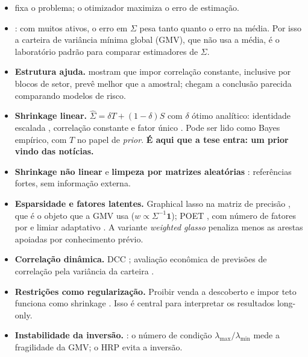 \documentclass[11pt,a4paper]{article}
\newcommand{\Sig}{\hat\Sigma}
\begin{document}
\begin{itemize}
  \item \citet{markowitz1952} fixa o problema; o otimizador maximiza o erro de estimação.
  \item \citet{kan2007}: com muitos ativos, o erro em $\Sigma$ pesa tanto quanto o erro na média.
        Por isso a carteira de variância mínima global (GMV), que não usa a média, é o laboratório
        padrão para comparar estimadores de $\Sigma$.
  \item \textbf{Estrutura ajuda.} \citet{elton1973} mostram que impor correlação constante, inclusive por
        blocos de setor, prevê melhor que a amostral; \citet{chan1999} chegam a conclusão parecida
        comparando modelos de risco.
  \item \textbf{Shrinkage linear.} $\Sig=\delta T+(1-\delta)S$ com $\delta$ ótimo analítico:
        identidade escalada \citep{ledoit2004jmva}, correlação constante \citep{ledoit2004honey} e
        fator único \citep{ledoit2003}. Pode ser lido como Bayes empírico, com $T$ no papel de
        \emph{prior}. \textbf{É aqui que a tese entra: um prior vindo das notícias.}
  \item \textbf{Shrinkage não linear} \citep{ledoit2017,ledoit2020} e \textbf{limpeza por matrizes
        aleatórias} \citep{laloux1999,bun2017}: referências fortes, sem informação externa.
  \item \textbf{Esparsidade e fatores latentes.} Graphical lasso na matriz de precisão
        \citep{friedman2008}, que é o objeto que a GMV usa ($w\propto\Sigma^{-1}\mathbf 1$); POET
        \citep{fan2013}, com número de fatores por \citet{bai2002} e limiar adaptativo
        \citep{cai2011}. A variante \emph{weighted glasso} penaliza menos as arestas apoiadas por
        conhecimento prévio.
  \item \textbf{Correlação dinâmica.} DCC \citep{engle2002}; avaliação econômica de previsões de
        correlação pela variância da carteira \citep{engle2006}.
  \item \textbf{Restrições como regularização.} Proibir venda a descoberto e impor teto funciona como
        shrinkage \citep{jagannathan2003}. Isso é central para interpretar os resultados long-only.
  \item \textbf{Instabilidade da inversão.} \citet{lopezdeprado2016,lopezdeprado2020}: o número de
        condição $\lambda_{\max}/\lambda_{\min}$ mede a fragilidade da GMV; o HRP evita a inversão.
\end{itemize}
\end{document}
